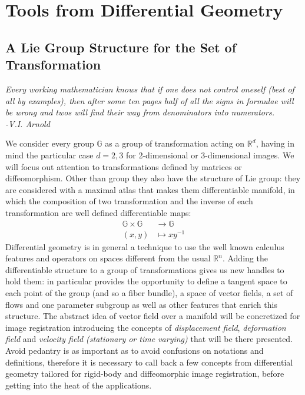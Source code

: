 \chapter{Tools from Differential Geometry}\label{ch:tools}

\section{A Lie Group Structure for the Set of Transformation}\label{ch:finite_lie_group}


\begin{flushright}
	\emph{Every working mathematician knows that if one does not control oneself (best of all by examples), then after some ten pages half of all the signs in formulae will be wrong and twos will find their way from denominators into numerators. \\ -V.I. Arnold}
\end{flushright}

We consider every group $\mathbb{G}$ as a group of transformation acting on $\mathbb{R}^{d}$, having in mind the particular case $d=2,3$ for 2-dimensional or 3-dimensional images.
We will focus out attention to transformations defined by matrices or diffeomorphism. Other than group they also have the structure of Lie group: they are considered with a maximal atlas that makes them differentiable manifold, in which the composition of two transformation and the inverse of each transformation are well defined differentiable maps:
\begin{align*}
\mathbb{G} \times \mathbb{G} & \longrightarrow  \mathbb{G}    \\
(x,y) &\longmapsto  x y^{-1}
\end{align*}
Differential geometry is in general a technique to use the well known calculus features and operators on spaces different from the usual $\mathbb{R}^{n}$. Adding the differentiable structure to a group of transformations gives us new handles to hold them: in particular provides the opportunity to define a tangent space to each point of the group (and so a fiber bundle), a space of vector fields, a set of flows and one parameter subgroup as well as other features that enrich this structure. The abstract idea of vector field over a manifold will be concretized for image registration introducing the concepts of \emph{displacement field}, \emph{deformation field} and \emph{velocity field (stationary or time varying)} that will be there presented. Avoid pedantry is as important as to avoid confusions on notations and definitions, therefore it is necessary to call back a few concepts from differential geometry tailored for rigid-body and diffeomorphic image registration, before getting into the heat of the applications. 

